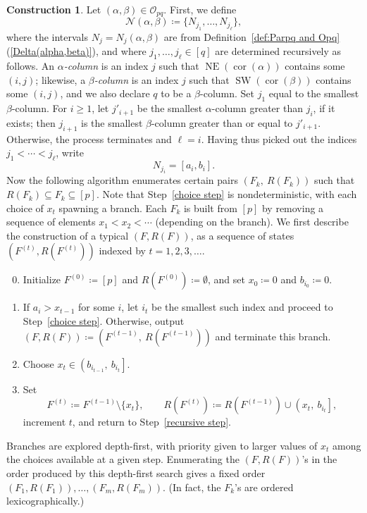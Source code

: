 \documentclass[noamsfonts,10pt]{amsart}
\newcommand{\NN}{\mathcal{N}}
\newcommand{\al}{\alpha}
\newcommand{\be}{\beta}
\renewcommand{\O}{\mathcal{O}}
\newcommand{\NE}[1]{\operatorname{NE}(#1)}
\newcommand{\SW}[1]{\operatorname{SW}(#1)}
\DeclareMathOperator{\cor}{cor}
\newcommand{\1}{\mathbf{1}}
\theoremstyle{plain}
\theoremstyle{definition}
\newtheorem{construction}[theorem]{Construction}
\numberwithin{equation}{section}
\begin{document}
\begin{construction}
    \label{const:F and R}
    Let $(\al,\be) \in \O_{pq}$.
    First, we define
    \[
        \NN(\al,\be) \coloneqq \{ N_{j_1}, \ldots, N_{j_\ell} \},
    \]
    where the intervals $N_j = N_j(\al,\be)$ are from Definition~\ref{def:Parpq and Opq}(\ref{Delta(alpha,beta)}), and where $j_1, \ldots, j_\ell \in [q]$ are determined recursively as follows.
    An \emph{$\al$-column} is an index $j$ such that $\NE{\cor(\al)}$ contains some $(i,j)$;
    likewise, a \emph{$\be$-column} is an index $j$ such that $\SW{\cor(\be)}$ contains some $(i,j)$, and we also declare $q$ to be a $\be$-column.
    Set $j_1$ equal to the smallest $\be$-column.
    For $i \geq 1$, let $j'_{i+1}$ be the smallest $\al$-column greater than $j_i$, if it exists; then $j_{i+1}$ is the smallest $\be$-column greater than or equal to $j'_{i+1}$.
    Otherwise, the process terminates and $\ell = i$.
    Having thus picked out the indices $j_{1} < \cdots < j_{\ell}$, write
    \begin{equation}
        \label{ai bi}
        N_{j_i} = [a_i, b_i].
    \end{equation}
    Now the following algorithm enumerates certain pairs $(F_k, \:R(F_k))$ such that $R(F_k) \subseteq F_k \subseteq [p]$.
Note that Step~\ref{choice step} is nondeterministic, with each choice of $x_t$ spawning a branch.
Each $F_k$ is built from $[p]$ by removing a sequence of elements $x_1 <  x_2 < \cdots$ (depending on the branch). We first describe the construction of a typical $(F,R(F))$, as a sequence of states $(F^{(t)}, R(F^{(t)}))$ indexed by $t=1,2,3,\ldots$.


\begin{enumerate}[label=\arabic*.,ref=\arabic*]
\setcounter{enumi}{-1}

    \item Initialize $F^{(0)} \coloneqq [p]$ and  $R(F^{(0)})\coloneqq \emptyset$, and set $x_0 \coloneqq 0$ and $b_{i_0} \coloneqq 0$.
    \item\label{recursive step} If $a_i>x_{t-1}$ for some $i$, let $i_t$ be the smallest such index and proceed to Step~\ref{choice step}. 
    Otherwise, output $(F,R(F)) \coloneqq (F^{(t-1)}, \: R(F^{(t-1)}))$ and terminate this branch.
    \item\label{choice step} Choose $x_t \in \left( b_{i_{t-1}}, \:b_{i_t} \right]$.
    \item \label{update step} Set
    \[
        F^{(t)} \coloneqq F^{(t-1)}\setminus\{x_t\},\qquad R(F^{(t)}) \coloneqq R(F^{(t-1)}) \cup \left(x_t, \: b_{i_t} \right],
    \]
    increment $t$, and return to Step~\ref{recursive step}.
\end{enumerate}
Branches are explored depth-first, with priority given to larger values of $x_t$ among the choices available at a given step. 
Enumerating the $(F,R(F))$'s in the order produced by this depth-first search gives a fixed order $(F_1,R(F_1)), \ldots, (F_m, R(F_m))$.
(In fact, the $F_k$'s are ordered lexicographically.)
    
\end{construction}
\end{document}
